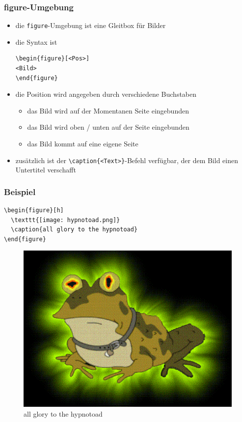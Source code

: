 \begin{frame}[fragile]
\frametitle{figure-Umgebung}
\begin{itemize}[<+->]
  \item die \texttt{figure}-Umgebung ist eine Gleitbox für Bilder
  \item die Syntax ist
  \begin{lstlisting}[style=Latex]
\begin{figure}[<Pos>]
<Bild>
\end{figure}  
  \end{lstlisting}
  \item die Position wird angegeben durch verschiedene Buchstaben
  \begin{itemize}
    \item[h] das Bild wird auf der Momentanen Seite eingebunden
    \item[t/b] das Bild wird oben / unten auf der Seite eingebunden
    \item[p] das Bild kommt auf eine eigene Seite
  \end{itemize}
  \item zusätzlich ist der \lstinline[style=Latex]+\caption{<Text>}+-Befehl verfügbar, der dem Bild einen Untertitel verschafft
\end{itemize}
\end{frame}

   
\begin{frame}[fragile]
\frametitle{Beispiel}
\begin{lstlisting}[style=Latex]
\begin{figure}[h]
  \texttt{[image: hypnotoad.png]}
  \caption{all glory to the hypnotoad}
\end{figure}
\end{lstlisting} \vspace{-25pt}
\pause
\begin{figure}[h]
  \includegraphics[width=.4\textwidth]{images/hypnotoad.png}
  \caption{all glory to the hypnotoad}
\end{figure}
\end{frame}

